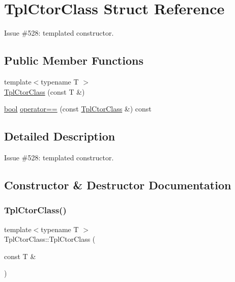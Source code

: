 \hypertarget{struct_tpl_ctor_class}{}\section{Tpl\+Ctor\+Class Struct Reference}
\label{struct_tpl_ctor_class}


Issue \#528\+: templated constructor.  


\subsection*{Public Member Functions}
\begin{DoxyCompactItemize}
\item 
{\footnotesize template$<$typename T $>$ }\\\mbox{\hyperlink{struct_tpl_ctor_class_a2e8a61b2afdb15167d92cfb88e4e819b}{Tpl\+Ctor\+Class}} (const T \&)
\item 
\mbox{\hyperlink{asdl_8h_af6a258d8f3ee5206d682d799316314b1}{bool}} \mbox{\hyperlink{struct_tpl_ctor_class_a524daa08d02c8b8fa13c0ec0c7592f66}{operator==}} (const \mbox{\hyperlink{struct_tpl_ctor_class}{Tpl\+Ctor\+Class}} \&) const
\end{DoxyCompactItemize}


\subsection{Detailed Description}
Issue \#528\+: templated constructor. 

\subsection{Constructor \& Destructor Documentation}
\mbox{\label{struct_tpl_ctor_class_a2e8a61b2afdb15167d92cfb88e4e819b}} 
\subsubsection{\texorpdfstring{TplCtorClass()}{TplCtorClass()}}
{\footnotesize\ttfamily template$<$typename T $>$ \\
Tpl\+Ctor\+Class\+::\+Tpl\+Ctor\+Class (\begin{DoxyParamCaption}\item[{const T \&}]{ }\end{DoxyParamCaption})\hspace{0.3cm}{\ttfamily [inline]}}



